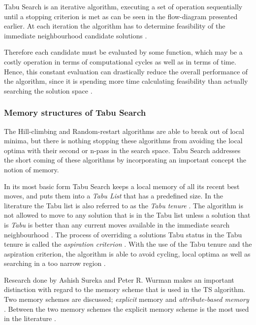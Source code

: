 Tabu Search is an iterative algorithm, executing a set of operation sequentially until a stopping criterion is met as can be seen in the flow-diagram presented earlier. At each iteration the algorithm has to determine feasibility of the immediate neighbourhood candidate solutions \cite{EvoParallelTabu,TabuVechicleRoutingWithTimeWindows}. 

Therefore each candidate must be evaluated by some function, which may be a costly operation in terms of computational cycles as well as in terms of time. Hence, this constant evaluation can drastically reduce the overall performance of the algorithm, since it is spending more time calculating feasibility than actually searching the solution space \cite{EvoParallelTabu,TabuVechicleRoutingWithTimeWindows}.

\subsubsection{Memory structures of Tabu Search}
The Hill-climbing and Random-restart algorithms are able to break out of local minima, but there is nothing stopping these algorithms from avoiding the local optima with their second or n-pass in the search space. Tabu Search addresses the short coming of these algorithms by incorporating an important concept the notion of memory.

In its most basic form Tabu Search keeps a local memory of all its recent best moves, and puts them into a \emph{Tabu List} that has a predefined size. In the literature the Tabu list is also referred to as the \emph{Tabu tenure} \cite{TSHazardous,TabuCarryOver,ReactiveTabuVHR,TabuParameterization}. The algorithm is not allowed to move to any solution that is in the Tabu list unless a solution that is \emph{Tabu} is better than any current moves available in the immediate search neighbourhood \cite{TSHazardous,TabuCarryOver,ReactiveTabuVHR,TabuParameterization}. The process of overriding a solutions Tabu status in the Tabu tenure is called the \emph{aspiration criterion} \cite{TSHazardous,TabuCarryOver,ReactiveTabuVHR,TabuParameterization}. With the use of the Tabu tenure and the aspiration criterion, the algorithm is able to avoid cycling, local optima as well as searching in a too narrow region \cite{TabuSingleMachineScheduling,CircuitTabu}.

Research done by Ashish Sureka and Peter R. Wurman makes an important distinction with regard to the memory scheme that is used in the TS algorithm. Two memory schemes are discussed; \emph{explicit} memory and \emph{attribute-based memory} \cite{TabuBiddingStrats,TabuFormGames}. Between the two memory schemes the explicit memory scheme is the most used in the literature \cite{TabuVechicleRoutingWithTimeWindows}.

